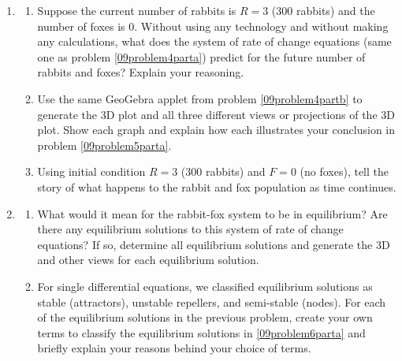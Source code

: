\begin{enumerate}
\clearpage
\item \label{09problem5}	\begin{enumerate}
\item Suppose the current number of rabbits is $R=3$ (300 rabbits)  and the number of foxes is 0. Without using any technology and without making any calculations, what does the system of rate of change equations (same one as problem \ref{09problem4parta}) predict for the future number of rabbits and foxes? Explain your reasoning. \label{09problem5parta}
\vfill
\item Use the same GeoGebra applet from problem \ref{09problem4partb} to generate the 3D plot and all three different views or projections of the 3D plot. Show each graph and explain how each illustrates your conclusion in problem \ref{09problem5parta}. \label{09problem5partb}
\vfill
\item Using initial condition $R = 3$ (300 rabbits) and $F = 0$ (no foxes), tell the story of what happens to the rabbit and fox population as time continues. \label{09problem5partc}
\vfill
\end{enumerate} 

\item \label{09problem6}
\begin{enumerate}
\item  What would it mean for the rabbit-fox system to be in equilibrium? Are there any equilibrium solutions to this system of rate of change equations? If so, determine all equilibrium solutions and generate the 3D and other views for each equilibrium solution. \label{09problem6parta}
\vfill

\item For single differential equations, we classified equilibrium solutions as stable (attractors), unstable repellers, and semi-stable (nodes).  For each of the equilibrium solutions in the previous problem, create your own terms to classify the equilibrium solutions in \ref{09problem6parta} and briefly explain your reasons behind your choice of terms. \label{09problem6partb}
\vfill
\end{enumerate}



\end{enumerate}
